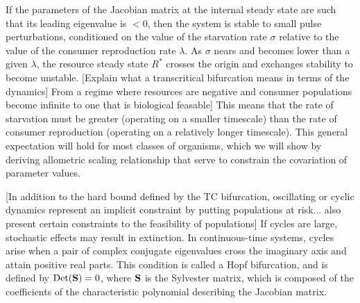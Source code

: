 \documentclass[12pt,english]{article}
\begin{document}
\begin{spacing}{1.9}
If the parameters of the Jacobian matrix at the internal steady state are such that its leading eigenvalue is $<0$, then the system is stable to small pulse perturbations, conditioned on the value of the starvation rate $\sigma$ relative to the value of the consumer reproduction rate $\lambda$.
As $\sigma$ nears and becomes lower than a given $\lambda$, the resource steady state $R^*$ crosses the origin and exchanges stability to become unstable.
[Explain what a transcritical bifurcation means in terms of the dynamics] From a regime where resources are negative and consumer populations become infinite to one that is biological feasable]
This means that the rate of starvation must be greater (operating on a smaller timescale) than the rate of consumer reproduction (operating on a relatively longer timescale).
This general expectation will hold for most classes of organisms, which we will show by deriving allometric scaling relationship that serve to constrain the covariation of parameter values.


[In addition to the hard bound defined by the TC bifurcation, oscillating or cyclic dynamics represent an implicit constraint by putting populations at risk... also present certain constraints to the feasibility of populations]
If cycles are large, stochastic effects may result in extinction.
In continuous-time systems, cycles arise when a pair of complex conjugate eigenvalues cross the imaginary axis and attain positive real parts.
This condition is called a Hopf bifurcation, and is defined by ${\rm Det}({\bf S}) = 0$, where $\bf S$ is the Sylvester matrix, which is composed of the coefficients of the characteristic polynomial describing the Jacobian matrix.



\end{spacing}
\end{document}
